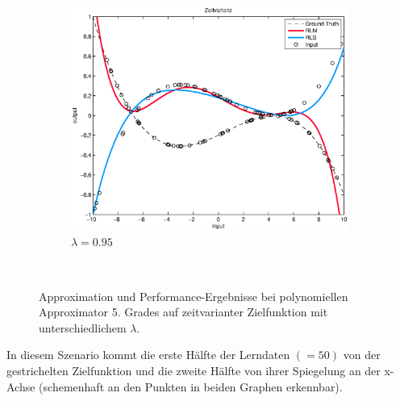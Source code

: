 \documentclass[a4paper, 12pt]{article}
\begin{document}
{\begin{figure}[H]
\begin{subfigure}[b]{0.4\textwidth}
                \includegraphics[width=\textwidth]{./images/copyofstats/zeitvarianz(95)5_approx_100.eps}
                \caption{$\lambda=0.95$}
                \label{fig:perf:zeitvarianz:approx95}
        \end{subfigure}
        \\
        \caption{Approximation und Performance-Ergebnisse bei polynomiellen Approximator 5. Grades auf zeitvarianter Zielfunktion mit unterschiedlichem $\lambda$.}
        \label{fig:perf:zeitvarianz}
\end{figure}
In diesem Szenario kommt die erste Hälfte der Lerndaten $(=50)$ von der gestrichelten Zielfunktion und die zweite Hälfte von ihrer Spiegelung an der x-Achse (schemenhaft an den Punkten in beiden Graphen erkennbar).

}
\end{document}
